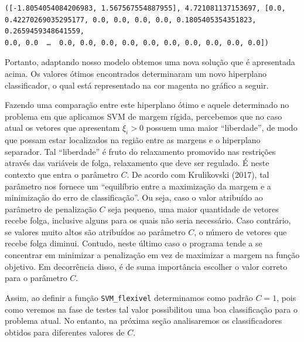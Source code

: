 \documentclass[12pt,a4paper]{scrartcl}
\makeatletter
\theoremstyle{definition}%
\newcommand{\boxspacing}{\kern\kvtcb@left@rule\kern\kvtcb@boxsep}
\newcommand{\prompt}[4]{
        \ttfamily\llap{{\color{#2}[#3]:\hspace{3pt}#4}}\vspace{-\baselineskip}
    }
\makeatother
\begin{document}
            \begin{tcolorbox}[breakable, size=fbox, boxrule=.5pt, pad at break*=1mm, opacityfill=0]
\prompt{Out}{outcolor}{12}{\boxspacing}
\begin{Verbatim}[commandchars=\\\{\}]
([-1.8054054084206983, 1.567567554887955], 4.721081137153697, [0.0,
0.42270269035295177, 0.0, 0.0, 0.0, 0.0, 0.1805405354351823, 0.2659459348641559,
0.0, 0.0  …  0.0, 0.0, 0.0, 0.0, 0.0, 0.0, 0.0, 0.0, 0.0, 0.0])
\end{Verbatim}
\end{tcolorbox}
        
    Portanto, adaptando nosso modelo obtemos uma nova solução que é
apresentada acima. Os valores ótimos encontrados determinaram um novo
hiperplano classificador, o qual está representado na cor magenta no
gráfico a seguir.

Fazendo uma comparação entre este hiperplano ótimo e aquele determinado
no problema em que aplicamos SVM de margem rígida, percebemos que no
caso atual os vetores que apresentam \(\xi_{i} > 0\) possuem uma maior
``liberdade'', de modo que possam estar localizados na região entre as
margens e o hiperplano separador. Tal ``liberdade'' é fruto do
relaxamento promovido nas restrições através das variáveis de folga,
relaxamento que deve ser regulado. É neste contexto que entra o
parâmetro \(C\). De acordo com Krulikovski (2017), tal parâmetro nos
fornece um ``equilíbrio entre a maximização da margem e a minimização do
erro de classificação''. Ou seja, caso o valor atribuído ao parâmetro de
penalização \(C\) seja pequeno, uma maior quantidade de vetores recebe
folga, inclusive alguns para os quais não seria necessário. Caso
contrário, se valores muito altos são atribuídos ao parâmetro \(C\), o
número de vetores que recebe folga diminui. Contudo, neste último caso o
programa tende a se concentrar em minimizar a penalização em vez de
maximizar a margem na função objetivo. Em decorrência disso, é de suma
importância escolher o valor correto para o parâmetro \(C\).

Assim, ao definir a função \texttt{SVM\_flexivel} determinamos como
padrão \(C=1\), pois como veremos na fase de testes tal valor
possibilitou uma boa classificação para o problema atual. No entanto, na
próxima seção analisaremos os classificadores obtidos para diferentes
valores de \(C\).
\end{document}
